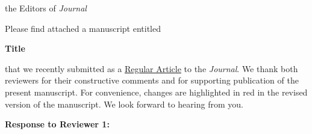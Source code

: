 \documentclass[10pt]{uhhlet}
\newcommand{\journal}{Journal}
\newcommand{\papertitle}{Title}
\begin{document}
\UKvardate\renewcommand{\headrulewidth}{0pt}

\renewcommand{\yoursdetails}{Yours sincerely, the authors}

\begin{letter}%
{the Editors of \textit{\journal{}}}


\vspace{-1em}
\justifying
Please find attached a manuscript entitled 
\vspace{-1.25em}
\begin{center}
\textbf{\papertitle{}}
\end{center}
\vspace{-1.25em}
that we recently submitted as a \underline{Regular Article} to the \textit{\journal}. 
We thank both reviewers for their constructive comments and for supporting publication of the present manuscript. 
For convenience, changes are highlighted in red in the revised version of the manuscript. We look forward to hearing from you.

\end{letter}
\clearpage
{\large \bf Response to Reviewer 1:}
\end{document}
